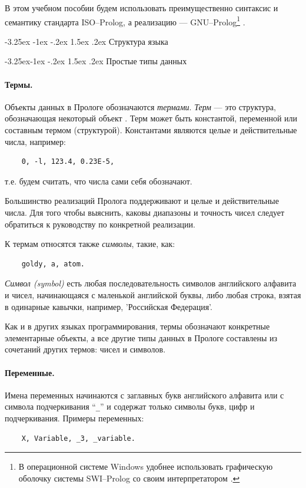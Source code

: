 \documentclass[12pt, openany, twoside]{book} %
\makeatletter
\renewcommand\section{\@startsection {section}{1}{\z@}%
                                   {-3.25ex \@plus -1ex \@minus -.2ex}%
                                   {1.5ex \@plus.2ex}%
                                   {\normalfont\large\bfseries}}
\renewcommand\subsection{\@startsection{subsection}{2}{\z@}%
                                     {-3.25ex\@plus -1ex \@minus -.2ex}%
                                     {1.5ex \@plus .2ex}%
                                     {\normalfont\normalsize\bfseries}}
\makeatother
\begin{document}
В этом учебном пособии будем использовать преимущественно синтаксис и семантику стандарта ISO--Prolog, а реализацию --- GNU--Prolog\footnote{В операционной системе Windows удобнее использовать графическую оболочку системы SWI--Prolog со своим интерпретатором \cite{SWIP}.} \cite{GNUP}.

\section{Структура языка}

\subsection{Простые типы данных}
\paragraph{Термы.}
Объекты данных в Прологе обозначаются \emph{термами}. {\em Терм} --- это структура, обозначающая некоторый объект  \cite{DDW}. Терм может быть константой, переменной или составным термом (структурой). Константами являются целые и действительные числа, например:
{\tt\begin{verbatim}
    0, -l, 123.4, 0.23E-5,
\end{verbatim}}
\noindent т.е. будем считать, что числа сами себя обозначают.

Большинство реализаций Пролога поддерживают и целые и действительные числа. Для того чтобы выяснить, каковы диапазоны и точность чисел следует обратиться к руководству по конкретной реализации.

К термам относятся также \emph{символы}, такие, как:
{\tt\begin{verbatim}
    goldy, а, atom.
\end{verbatim}}

{\em Символ (symbol)} есть любая последовательность символов английского алфавита и чисел, начинающаяся с маленькой английской буквы, либо любая строка, взятая в одинарные кавычки, например, 'Российская Федерация'.

Как и в других языках программирования, термы обозначают конкретные элементарные объекты, а все другие типы данных в Прологе составлены из сочетаний других термов: чисел и символов.

\paragraph{Переменные.}
Имена переменных начинаются с заглавных букв английского алфавита или с символа подчеркивания ``{\tt \_}'' и содержат только символы букв, цифр и подчеркивания. Примеры переменных:
{\tt\begin{verbatim}
    X, Variable, _3, _variable.
\end{verbatim}}
\end{document}

